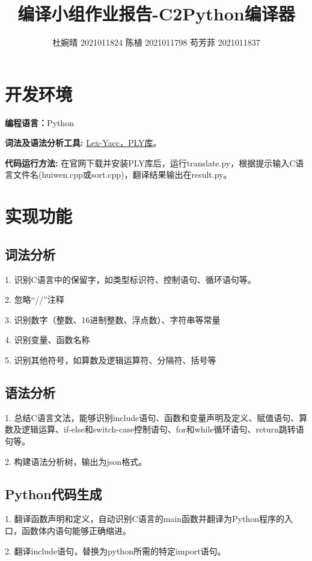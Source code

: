 \documentclass{article}
\begin{document}
\title{\textbf{编译小组作业报告-C2Python编译器}}
\author{杜婉晴 2021011824 陈植 2021011798 苟芳菲 2021011837}
\maketitle \thispagestyle{empty}
\section{开发环境}

\textbf{编程语言：}Python

\textbf{词法及语法分析工具: }
\href{https://tastones.com/stackoverflow/python-language/python-lex-yacc/getting_started_with_ply/}{Lex-Yacc，PLY库}。

\textbf{代码运行方法: }在官网下载并安装PLY库后，运行translate.py，根据提示输入C语言文件名(huiwen.cpp或sort.cpp)，翻译结果输出在result.py。

\section{实现功能}
\subsection{词法分析}
1. 识别C语言中的保留字，如类型标识符、控制语句、循环语句等。

2. 忽略“//”注释

3. 识别数字（整数、16进制整数、浮点数）、字符串等常量

4. 识别变量、函数名称

5. 识别其他符号，如算数及逻辑运算符、分隔符、括号等

\subsection{语法分析}
1. 总结C语言文法，能够识别include语句、函数和变量声明及定义、赋值语句、算数及逻辑运算、if-else和switch-case控制语句、for和while循环语句、return跳转语句等。


2. 构建语法分析树，输出为json格式。

\subsection{Python代码生成}
1. 翻译函数声明和定义，自动识别C语言的main函数并翻译为Python程序的入口，函数体内语句能够正确缩进。

2. 翻译include语句，替换为python所需的特定import语句。
\end{document}
